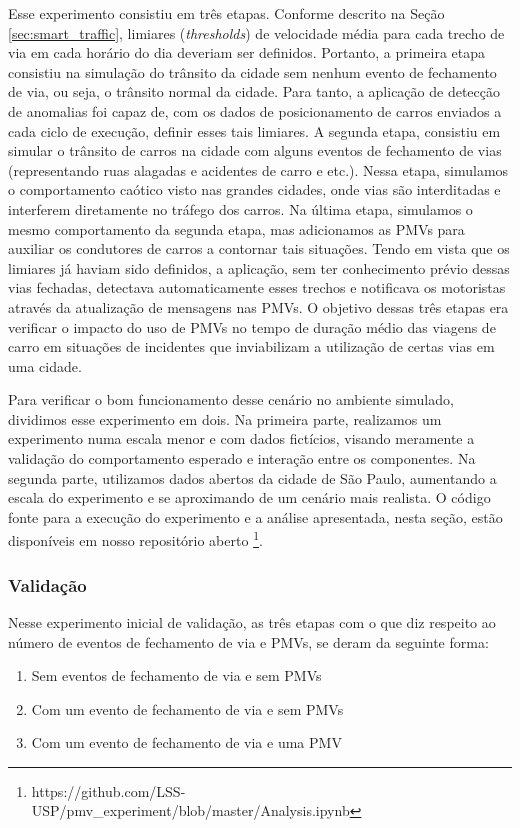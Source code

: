 Esse experimento consistiu em três etapas.
Conforme descrito na Seção \ref{sec:smart_traffic}, limiares (\textit{thresholds}) de velocidade média para cada trecho de via em cada horário do dia deveriam ser definidos.
Portanto, a primeira etapa consistiu na simulação do trânsito da cidade sem nenhum evento de fechamento de via, ou seja, o trânsito normal da cidade.
Para tanto, a aplicação de detecção de anomalias foi capaz de, com os dados de posicionamento de carros enviados a cada ciclo de execução, definir esses tais limiares.
A segunda etapa, consistiu em simular o trânsito de carros na cidade com alguns eventos de fechamento de vias (representando ruas alagadas e acidentes de carro e etc.).
Nessa etapa, simulamos o comportamento caótico visto nas grandes cidades, onde vias são interditadas e interferem diretamente no tráfego dos carros.
Na última etapa, simulamos o mesmo comportamento da segunda etapa, mas adicionamos as PMVs para auxiliar os condutores de carros a contornar tais situações.
Tendo em vista que os limiares já haviam sido definidos, a aplicação, sem ter conhecimento prévio dessas vias fechadas, detectava automaticamente esses trechos e notificava os motoristas através da
atualização de mensagens nas PMVs.
O objetivo dessas três etapas era verificar o impacto do uso de PMVs no tempo de duração médio das viagens de carro em situações de incidentes que inviabilizam a utilização de certas vias em uma cidade.

Para verificar o bom funcionamento desse cenário no ambiente simulado, dividimos esse experimento em dois.
Na primeira parte, realizamos um experimento numa escala menor e com dados fictícios, visando meramente a validação do comportamento esperado e interação entre os componentes.
Na segunda parte, utilizamos dados abertos da cidade de São Paulo, aumentando a escala do experimento e se aproximando de um cenário mais realista.
O código fonte para a execução do experimento e a análise apresentada, nesta seção, estão disponíveis em nosso repositório aberto
\footnote{https://github.com/LSS-USP/pmv\_experiment/blob/master/Analysis.ipynb}.

\subsubsection{Validação}

Nesse experimento inicial de validação, as três etapas com o que diz respeito ao número de eventos de fechamento de via e PMVs, se deram da seguinte forma:

\begin{enumerate}
    \item Sem eventos de fechamento de via e sem PMVs

    \item Com um evento de fechamento de via e sem PMVs

    \item Com um evento de fechamento de via e uma PMV
\end{enumerate}

